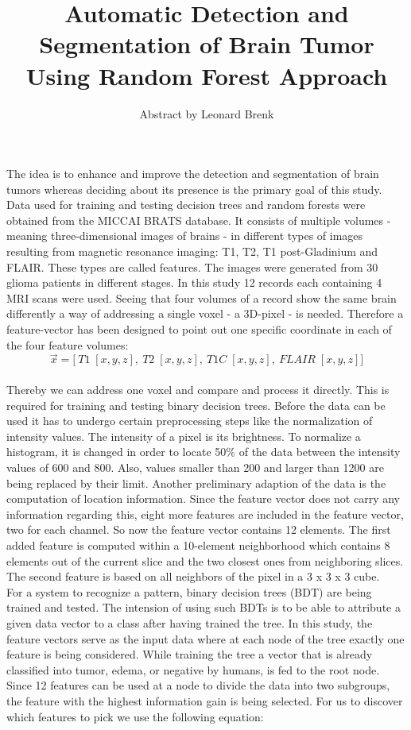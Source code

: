 \documentclass{article}
\title{Automatic Detection and Segmentation of Brain Tumor Using Random Forest Approach}
\author{Abstract by Leonard Brenk}
\begin{document}
 \maketitle
 \newpage

 The idea is to enhance and improve the detection and segmentation of brain tumors whereas deciding about its presence is the primary goal of this study. Data used for training and testing decision trees and random forests were obtained from the MICCAI BRATS database. It consists of multiple volumes - meaning three-dimensional images of brains - in different types of images resulting from magnetic resonance imaging: T1, T2, T1 post-Gladinium and FLAIR. These types are called features. The images were generated from 30 glioma patients in different stages. In this study 12 records each containing 4 MRI scans were used. Seeing that four volumes of a record show the same brain differently a way of addressing a single voxel - a 3D-pixel - is needed. Therefore a feature-vector has been designed to point out one specific coordinate in each of the four feature volumes:\\

 \[ \vec{x} = \bigg[ \: T1\; [x,y,z], \: T2\; [x,y,z], \: T1C\; [x,y,z],\: FLAIR\; [x,y,z] \bigg] \]\\

 Thereby we can address one voxel and compare and process it directly. This is required for training and testing binary decision trees. Before the data can be used it has to undergo certain preprocessing steps like the normalization of intensity values. The intensity of a pixel is its brightness. To normalize a histogram, it is changed in order to locate 50\% of the data between the intensity values of 600 and 800. Also, values smaller than 200 and larger than 1200 are being replaced by their limit. Another preliminary adaption of the data is the computation of location information. Since the feature vector does not carry any information regarding this, eight more features are included in the feature vector, two for each channel. So now the feature vector contains 12 elements. The first added feature is computed within a 10-element neighborhood which contains 8 elements out of the current slice and the two closest ones from neighboring slices. The second feature is based on all neighbors of the pixel in a 3 x 3 x 3 cube.\\


  For a system to recognize a pattern, binary decision trees (BDT) are being trained and tested. The intension of using such BDTs is to be able to attribute a given data vector to a class after having trained the tree. In this study, the feature vectors serve as the input data where at each node of the tree exactly one feature is being considered. While training the tree a vector that is already classified into tumor, edema, or negative by humans, is fed to the root node. Since 12 features can be used at a node to divide the data into two subgroups, the feature with the highest information gain is being selected. For us to discover which features to pick we use the following equation:
\end{document}
